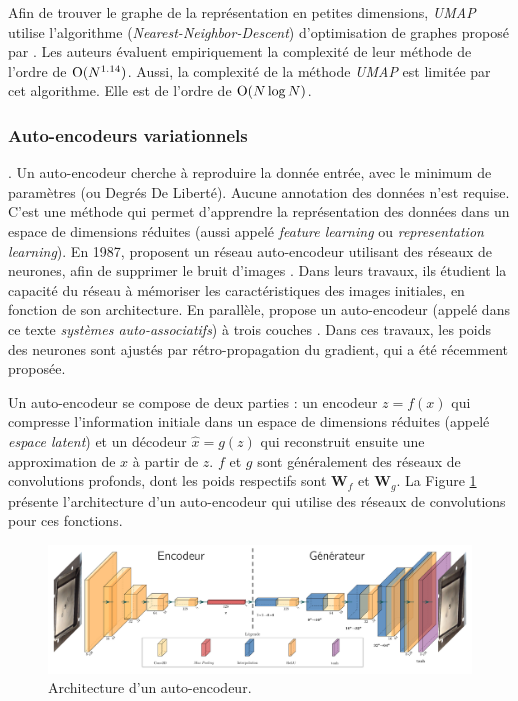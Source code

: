Afin de trouver le graphe de la représentation en petites dimensions, \textit{UMAP} utilise l'algorithme (\textit{Nearest-Neighbor-Descent}) d'optimisation de graphes proposé par \citeauthor{dong_efficient_2011} \cite{dong_efficient_2011}.
Les auteurs évaluent empiriquement la complexité de leur méthode de l'ordre de $\operatorname{O}(N^{1.14})$.
Aussi, la complexité de la méthode \textit{UMAP} est limitée par cet algorithme.
Elle est de l'ordre de $\operatorname{O}(N \log N)$.


\subsubsection{Auto-encodeurs variationnels} \label{subsubsec:vae}.
Un auto-encodeur cherche à reproduire la donnée entrée, avec le minimum de paramètres (ou Degrés De Liberté).
Aucune annotation des données n'est requise.
C'est une méthode qui permet d'apprendre la représentation des données dans un espace de dimensions réduites (aussi appelé \textit{feature learning} ou \textit{representation learning}).
En 1987, \citeauthor{lecun_modeles_1987, gallinari_memoires_1987} proposent un réseau auto-encodeur utilisant des réseaux de neurones, afin de supprimer le bruit d'images \cite{lecun_modeles_1987, gallinari_memoires_1987}.
Dans leurs travaux, ils étudient la capacité du réseau à mémoriser les caractéristiques des images initiales, en fonction de son architecture.
En parallèle, \citeauthor{ballard_modular_1987} propose un auto-encodeur (appelé dans ce texte \textit{systèmes auto-associatifs}) à trois couches \cite{ballard_modular_1987}.
Dans ces travaux, les poids des neurones sont ajustés par rétro-propagation du gradient, qui a été récemment proposée.

Un auto-encodeur se compose de deux parties : un encodeur $z = f(x)$ qui compresse l'information initiale dans un espace de dimensions réduites (appelé \textit{espace latent}) et un décodeur $\hat x = g(z)$ qui reconstruit ensuite une approximation de $x$ à partir de $z$.
$f$ et $g$ sont généralement des réseaux de convolutions profonds, dont les poids respectifs sont $\mathbf{W}_f$ et $\mathbf{W}_g$.
La Figure \ref{fig:autoencoder_architecture} présente l'architecture d'un auto-encodeur qui utilise des réseaux de convolutions pour ces fonctions.

\begin{figure}[hbtp]
    \centering
    \includegraphics[width=\textwidth,height=\textheight,keepaspectratio]{../Chap3/Figures/autoencoder_architecture.pdf}
    \caption{Architecture d'un auto-encodeur.}
    \label{fig:autoencoder_architecture}
\end{figure}

